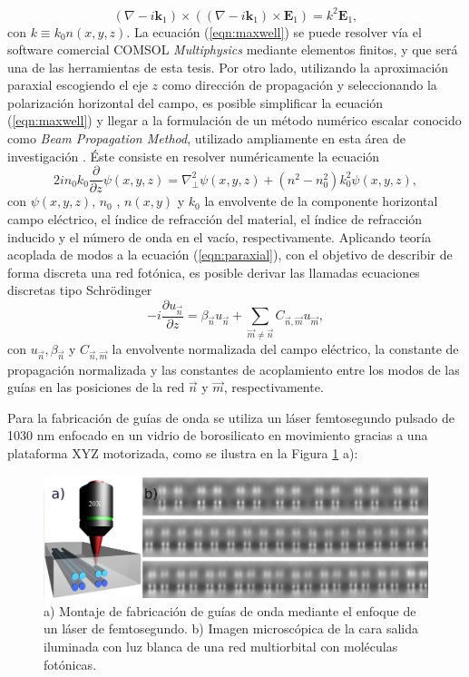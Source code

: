 \documentclass{article}
\begin{document}
\begin{equation}
	(\nabla-i\textbf{k}_1)\times((\nabla-i\textbf{k}_1)\times \textbf{E}_1) = k^2 \textbf{E}_1,
	 \label{eqn:maxwell}
\end{equation}
con $k \equiv k_0 n(x,y,z)$.
La ecuación (\ref{eqn:maxwell}) se puede resolver vía el software comercial COMSOL \textit{Multiphysics} mediante elementos finitos, y que será una de las herramientas de esta tesis. Por otro lado, utilizando la aproximación paraxial escogiendo el eje $z$  como dirección de propagación y seleccionando la polarización horizontal del campo, es posible simplificar la ecuación (\ref{eqn:maxwell}) y llegar a la formulación de un método numérico escalar conocido como \textit{Beam Propagation Method}, utilizado ampliamente en esta área de investigación \cite{bics, interorbital, OAMCaging, vortex, bpm}. Éste consiste en resolver numéricamente la ecuación
\begin{equation}
	2in_0k_0\frac{\partial}{\partial z}\psi(x,y,z) = \nabla_\perp^2 \psi (x,y,z) + \left(n^2-n_0^2\right)k_0^2 \psi (x,y,z), \label{eqn:paraxial}
\end{equation}
con $\psi(x,y,z)$, $n_0$ , $n(x,y)$ y $k_0$ la envolvente de la componente horizontal campo eléctrico, el índice de refracción del material, el índice de refracción inducido y el número de onda en el vacío, respectivamente. Aplicando teoría acoplada de modos \cite{coupledmodetheory} a la ecuación (\ref{eqn:paraxial}), con el objetivo de describir de forma discreta una red fotónica, es posible derivar las llamadas ecuaciones discretas tipo Schrödinger \cite{discretesolitons, artificialFB, FBdynamics}
\begin{equation}
	-i\frac{\partial u_{\vec{n}} }{\partial z} = \beta_{\vec{n}}u_{\vec{n}} + \sum_{\vec{m}\neq\vec{n}} C_{\vec{n},\vec{m}}u_{\vec{m}}, \label{eqn:CMT}
\end{equation}
con $u_{\vec{n}}, \beta_{\vec{n}}$ y $C_{\vec{n}, \vec{m}}$ la envolvente normalizada del campo eléctrico, la constante de propagación normalizada y las constantes de acoplamiento entre los modos de las guías en las posiciones de la red $\vec{n}$ y $\vec{m}$, respectivamente.


Para la fabricación de guías de onda se utiliza un láser femtosegundo pulsado de 1030 nm enfocado en un vidrio de borosilicato en movimiento gracias a una plataforma XYZ motorizada, como se ilustra en la Figura \ref{fig:femtosetup} a): 

\begin{figure}[H]
	\centering
	\includegraphics[width=0.7\linewidth]{./media/femtosetup.png}
	\caption{a) Montaje de fabricación de guías de onda mediante el enfoque de un láser de femtosegundo. b) Imagen microscópica de la cara salida iluminada con luz blanca de una red multiorbital con moléculas fotónicas. \label{fig:femtosetup}}
\end{figure}
\end{document}
